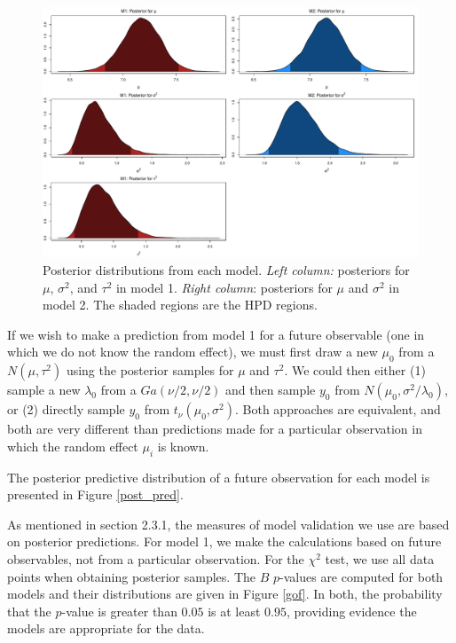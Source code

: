 \documentclass{asaproc}
\begin{document}
\begin{figure}[ht]
\centering
\includegraphics[scale=0.50]{figs/m_post.pdf}
\caption{Posterior distributions from each model. \emph{Left column:} posteriors for $\mu$, $\sigma^2$, and $\tau^2$ in model 1. \emph{Right column}: posteriors for $\mu$ and $\sigma^2$ in model 2. The shaded regions are the HPD regions.}
\label{m_post}
\end{figure}

If we wish to make a prediction from model 1 for a future observable (one in which we do not know the random effect), we must first draw a new $\mu_0$ from a $N(\mu,\tau^2)$ using the posterior samples for $\mu$ and $\tau^2$. We could then either (1) sample a new $\lambda_0$ from a $Ga(\nu/2,\nu/2)$ and then sample $y_0$ from $N(\mu_0, \sigma^2/\lambda_0)$, or (2) directly sample $y_0$ from $t_\nu(\mu_0, \sigma^2)$. Both approaches are equivalent, and both are very different than predictions made for a particular observation in which the random effect $\mu_i$ is known.

The posterior predictive distribution of a future observation for each model is presented in Figure \ref{post_pred}.

As mentioned in section 2.3.1, the measures of model validation we use are based on posterior predictions. For model 1, we make the calculations based on future observables, not from a particular observation. For the $\chi^2$ test, we use all data points when obtaining posterior samples. The $B$ $p$-values are computed for both models and their distributions are given in Figure \ref{gof}. In both, the probability that the $p$-value is greater than $0.05$ is at least $0.95$, providing evidence the models are appropriate for the data.
\end{document}
